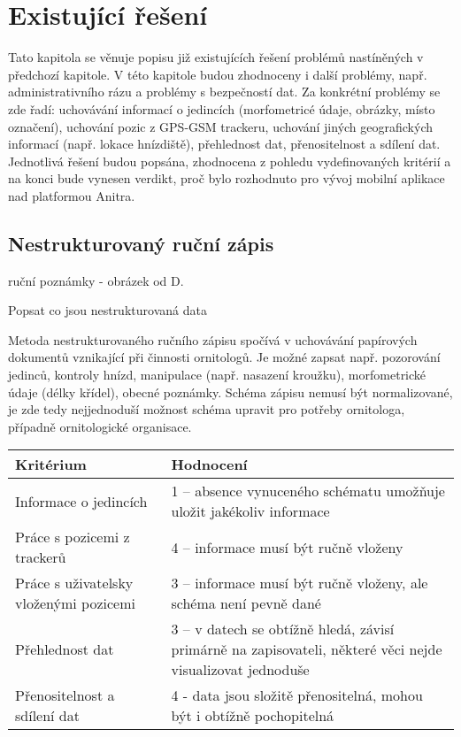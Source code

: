 
\chapter{Existující řešení}

Tato kapitola se věnuje popisu již existujících řešení problémů nastíněných v předchozí kapitole. V této kapitole budou zhodnoceny i další problémy, např. administrativního rázu a problémy s bezpečností dat. Za konkrétní problémy se zde řadí: uchovávání informací o jedincích (morfometricé údaje, obrázky, místo označení), uchování pozic z GPS-GSM trackeru, uchování jiných geografických informací (např. lokace hnízdiště), přehlednost dat, přenositelnost a sdílení dat. Jednotlivá řešení budou popsána, zhodnocena z pohledu vydefinovaných kritérií a na konci bude vynesen verdikt, proč bylo rozhodnuto pro vývoj mobilní aplikace nad platformou Anitra. 


\section{Nestrukturovaný ruční zápis}

ruční poznámky - obrázek od D.

Popsat co jsou nestrukturovaná data

Metoda nestrukturovaného ručního zápisu spočívá v uchovávání papírových dokumentů vznikající při činnosti ornitologů. Je možné zapsat např. pozorování jedinců, kontroly hnízd, manipulace (např. nasazení kroužku), morfometrické údaje (délky křídel), obecné poznámky. Schéma zápisu nemusí být normalizované, je zde tedy nejjednoduší možnost schéma upravit pro potřeby ornitologa, případně ornitologické organisace.

\begin{table}[h]
	\begin{tabular}{ l | l }
		Kritérium                              & Hodnocení \\
 		\hline			
		Informace o jedincích                  & 1 -- absence vynuceného schématu umožňuje uložit jakékoliv informace          \\
		Práce s pozicemi z trackerů            & 4 -- informace musí být ručně vloženy          \\
		Práce s uživatelsky vloženými pozicemi & 3 -- informace musí být ručně vloženy, ale schéma není pevně dané          \\
		Přehlednost dat                        & 3 -- v datech se obtížně hledá, závisí primárně na zapisovateli, některé věci nejde visualizovat jednoduše          \\
		Přenositelnost a sdílení dat           & 4 - data jsou složitě přenositelná, mohou být i obtížně pochopitelná          \\
		\hline	
	\end{tabular}
\end{table}

